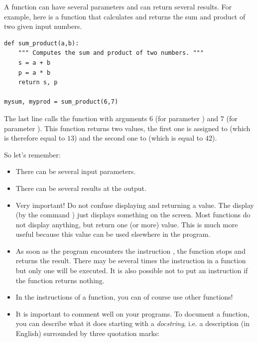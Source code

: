 \documentclass[11pt,class=report,crop=false]{standalone}
\begin{document}
\begin{cours}

A function can have several parameters and can return several results.
For example, here is a function that calculates and returns the sum and product of two given input numbers.

\begin{center}
\begin{lstlisting}
def sum_product(a,b):
    """ Computes the sum and product of two numbers. """
    s = a + b
    p = a * b
    return s, p

mysum, myprod = sum_product(6,7)
\end{lstlisting}
\end{center}

The last line calls the function with arguments $6$ (for parameter ) and $7$ (for parameter ). This function returns two values, the first one is assigned to  (which is therefore equal to $13$) and the second one to  (which is equal to $42$).


So let's remember:
\begin{itemize}
  \item There can be several input parameters.
  
  \item There can be several results at the output.
  
  \item Very important! Do not confuse displaying and returning a value.
  The display (by the command ) just displays something on the screen. Most functions do not display anything, but return one (or more) value. This is much more useful because this value can be used elsewhere in the program.
  
  \item As soon as the program encounters the instruction , the function stops and returns the result. There may be several times the instruction  in a function but only one will be executed. It is also possible not to put an instruction  if the function returns nothing.
  
  \item In the instructions of a function, you can of course use other functions!
   
  \item It is important to comment well on your programs. To document a function, you can describe what it does starting with a \emph{docstring}, i.e. a description (in English) surrounded by three quotation marks:   
  

\end{itemize}
\end{cours}
\end{document}

